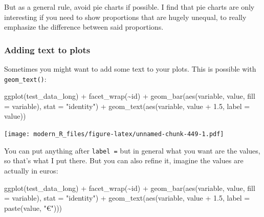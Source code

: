 \documentclass[
]{article}
\newenvironment{Shaded}{\begin{snugshade}}{\end{snugshade}}
\newcommand{\AttributeTok}[1]{\textcolor[rgb]{0.77,0.63,0.00}{#1}}
\newcommand{\FloatTok}[1]{\textcolor[rgb]{0.00,0.00,0.81}{#1}}
\newcommand{\FunctionTok}[1]{\textcolor[rgb]{0.00,0.00,0.00}{#1}}
\newcommand{\NormalTok}[1]{#1}
\newcommand{\SpecialCharTok}[1]{\textcolor[rgb]{0.00,0.00,0.00}{#1}}
\newcommand{\StringTok}[1]{\textcolor[rgb]{0.31,0.60,0.02}{#1}}
\begin{document}
But as a general rule, avoid pie charts if possible. I find that pie charts are only interesting if
you need to show proportions that are hugely unequal, to really emphasize the difference between
said proportions.

\hypertarget{adding-text-to-plots}{%
\subsubsection{Adding text to plots}\label{adding-text-to-plots}}

Sometimes you might want to add some text to your plots. This is possible with \texttt{geom\_text()}:

\begin{Shaded}
\begin{Highlighting}[]
\FunctionTok{ggplot}\NormalTok{(test\_data\_long) }\SpecialCharTok{+}
  \FunctionTok{facet\_wrap}\NormalTok{(}\SpecialCharTok{\textasciitilde{}}\NormalTok{id) }\SpecialCharTok{+}
  \FunctionTok{geom\_bar}\NormalTok{(}\FunctionTok{aes}\NormalTok{(variable, value, }\AttributeTok{fill =}\NormalTok{ variable), }\AttributeTok{stat =} \StringTok{"identity"}\NormalTok{) }\SpecialCharTok{+}
  \FunctionTok{geom\_text}\NormalTok{(}\FunctionTok{aes}\NormalTok{(variable, value }\SpecialCharTok{+} \FloatTok{1.5}\NormalTok{, }\AttributeTok{label =}\NormalTok{ value))}
\end{Highlighting}
\end{Shaded}

\texttt{[image: modern\_R\_files/figure-latex/unnamed-chunk-449-1.pdf]}

You can put anything after \texttt{label\ =} but in general what you want are the values, so that's what
I put there. But you can also refine it, imagine the values are actually in euros:

\begin{Shaded}
\begin{Highlighting}[]
\FunctionTok{ggplot}\NormalTok{(test\_data\_long) }\SpecialCharTok{+}
  \FunctionTok{facet\_wrap}\NormalTok{(}\SpecialCharTok{\textasciitilde{}}\NormalTok{id) }\SpecialCharTok{+}
  \FunctionTok{geom\_bar}\NormalTok{(}\FunctionTok{aes}\NormalTok{(variable, value, }\AttributeTok{fill =}\NormalTok{ variable), }\AttributeTok{stat =} \StringTok{"identity"}\NormalTok{) }\SpecialCharTok{+}
  \FunctionTok{geom\_text}\NormalTok{(}\FunctionTok{aes}\NormalTok{(variable, value }\SpecialCharTok{+} \FloatTok{1.5}\NormalTok{, }\AttributeTok{label =} \FunctionTok{paste}\NormalTok{(value, }\StringTok{"€"}\NormalTok{)))}
\end{Highlighting}
\end{Shaded}
\end{document}
